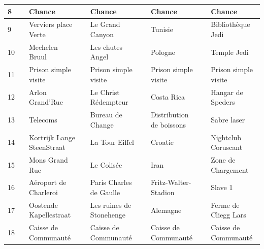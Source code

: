 \documentclass[letterpaper]{article}
\begin{document}
{\begin{tabular}{|l|l|l|l|l|l|l|l|l|}
      8 & \cellcolor[HTML]{FFC1C1} & Chance & \cellcolor[HTML]{FFC1C1} & Chance & \cellcolor[HTML]{FFC1C1} & Chance & \cellcolor[HTML]{FFC1C1} & Chance \\ \hline
      9 & \cellcolor[HTML]{1E90FF} & Verviers place Verte & \cellcolor[HTML]{00BFFF} & Le Grand Canyon & \cellcolor[HTML]{00BFFF} & Tunisie & \cellcolor[HTML]{00BFFF} & Bibliothèque Jedi \\ \hline
      10 & \cellcolor[HTML]{1E90FF} & Mechelen Bruul & \cellcolor[HTML]{00BFFF} & Les chutes Angel & \cellcolor[HTML]{00BFFF} & Pologne & \cellcolor[HTML]{00BFFF} & Temple Jedi \\ \hline
      11 & \cellcolor[HTML]{000000} & Prison simple visite & \cellcolor[HTML]{FFFFFF} & Prison simple visite & \cellcolor[HTML]{FFFFFF} & Prison simple visite & \cellcolor[HTML]{FFFFFF} & Prison simple visite \\ \hline
      12 & \cellcolor[HTML]{FF69B4} & Arlon Grand'Rue & \cellcolor[HTML]{9932CC} & Le Christ Rédempteur & \cellcolor[HTML]{D02090} & Costa Rica & \cellcolor[HTML]{D02090} & Hangar de Speders \\ \hline
      13 & \cellcolor[HTML]{FFFFF0} & Telecoms & \cellcolor[HTML]{FFFFF0} & Bureau de Change & \cellcolor[HTML]{FFFFF0} & Distribution de boissons & \cellcolor[HTML]{FFFFF0} & Sabre laser \\ \hline
      14 & \cellcolor[HTML]{FF69B4} & Kortrijk Lange SteenStraat & \cellcolor[HTML]{9932CC} & La Tour Eiffel & \cellcolor[HTML]{D02090} & Croatie & \cellcolor[HTML]{D02090} & Nightclub Coruscant \\ \hline
      15 & \cellcolor[HTML]{FF69B4} & Mons Grand Rue & \cellcolor[HTML]{9932CC} & Le Colisée & \cellcolor[HTML]{D02090} & Iran & \cellcolor[HTML]{D02090} & Zone de Chargement \\ \hline
      16 & \cellcolor[HTML]{E6E6FA} & Aéroport de Charleroi & \cellcolor[HTML]{E6E6FA} & Paris Charles de Gaulle & \cellcolor[HTML]{E6E6FA} & Fritz-Walter-Stadion & \cellcolor[HTML]{E6E6FA} & Slave 1 \\ \hline
      17 & \cellcolor[HTML]{FF8C00} & Oostende Kapellestraat & \cellcolor[HTML]{FF8C00} & Les ruines de Stonehenge & \cellcolor[HTML]{FF8C00} & Alemagne & \cellcolor[HTML]{FF8C00} & Ferme de Cliegg Lars \\ \hline
      18 & \cellcolor[HTML]{EEEED1} & Caisse de Communauté & \cellcolor[HTML]{EEEED1} & Caisse de Communauté & \cellcolor[HTML]{EEEED1} & Caisse de Communauté & \cellcolor[HTML]{EEEED1} & Caisse de Communauté \\ \hline

\end{tabular}}
\end{document}
